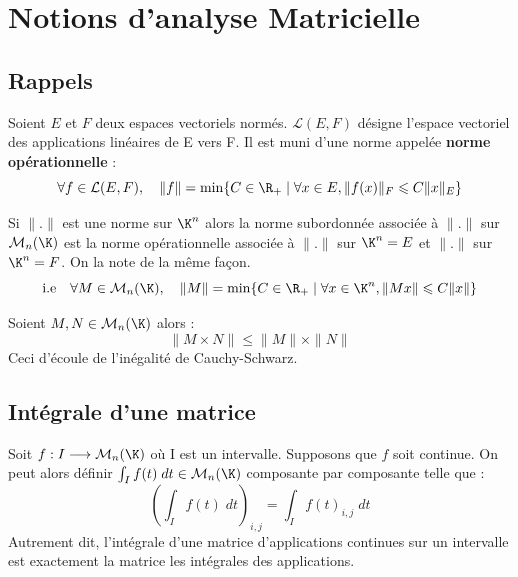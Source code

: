 \minitoc  %


\section{Notions d'analyse Matricielle}

\subsection{Rappels}

Soient $E$ et $F$ deux espaces vectoriels normés. $ \mathcal{L}(E,F)$ désigne l'espace vectoriel des applications linéaires 
de E vers F. Il est muni d'une norme appelée \textbf{norme opérationnelle} : 
    \[ \forall f \in \mathcal{L}(E,F), \quad \| f \| = \min \{ C \in \R_+ \; | \; \forall x \in E, \| f(x) \|_F \leqslant C \| x \|_E \} \]

\begin{definition}
    Si $\|.\|$ est une norme sur $\K^n$ alors la norme subordonnée associée à $\|.\|$ sur $ \mathcal{M}_n(\K)$ est 
    la norme opérationnelle associée à $\|.\|$ sur $\K^n = E$ et $\|.\|$ sur $\K^n = F$. On la note de la même façon. 
    \[ \text{i.e} \quad \forall M \in \mathcal{M}_n(\K), \quad  \| M \| = \min \{ C \in \R_+ \; | \; \forall x \in \K^n, \| Mx \| \leqslant C \| x \| \} \]
\end{definition}

\begin{proposition}
    Soient $M,N \in \mathcal{M}_n(\K)$ alors :
        \[ \| M \times N \| \leqslant \|M\| \times \|N\| \]
    Ceci d'écoule de l'inégalité de Cauchy-Schwarz. 
\end{proposition}

\subsection{Intégrale d'une matrice}

\begin{remark}
    Soit $f : I \longrightarrow \mathcal{M}_n(\K)$ où I est un intervalle. Supposons que $f$ soit continue. 
    On peut alors définir $ \int_I f(t) \; dt \in \mathcal{M}_n(\K)$ composante par composante telle que :
        \[ \left( \int_I f(t) \; dt \right)_{i,j} = \int_I f(t)_{i,j} \; dt \] 
    Autrement dit, l'intégrale d'une matrice d'applications continues sur un intervalle est exactement la matrice 
    les intégrales des applications. 
\end{remark}


